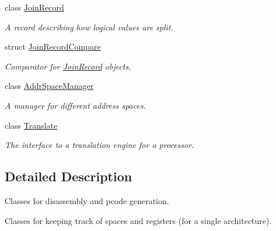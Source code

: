 \begin{DoxyCompactItemize}
class \mbox{\hyperlink{class_join_record}{Join\+Record}}
\begin{DoxyCompactList}\small\item\em A record describing how logical values are split. \end{DoxyCompactList}\item 
struct \mbox{\hyperlink{struct_join_record_compare}{Join\+Record\+Compare}}
\begin{DoxyCompactList}\small\item\em Comparator for \mbox{\hyperlink{class_join_record}{Join\+Record}} objects. \end{DoxyCompactList}\item 
class \mbox{\hyperlink{class_addr_space_manager}{Addr\+Space\+Manager}}
\begin{DoxyCompactList}\small\item\em A manager for different address spaces. \end{DoxyCompactList}\item 
class \mbox{\hyperlink{class_translate}{Translate}}
\begin{DoxyCompactList}\small\item\em The interface to a translation engine for a processor. \end{DoxyCompactList}\end{DoxyCompactItemize}


\subsection{Detailed Description}
Classes for disassembly and pcode generation. 

Classes for keeping track of spaces and registers (for a single architecture). 